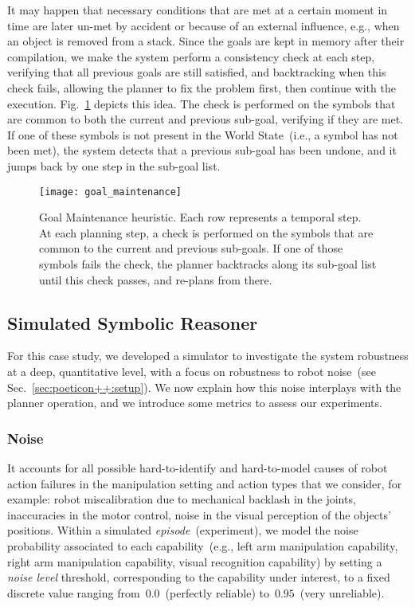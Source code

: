 It may happen that necessary conditions that are met at a certain moment in time are later un-met by accident or because of an external influence, e.g.,
when an object is removed from a stack.
Since the goals are kept in memory after their compilation, we make the system perform a consistency check at each step, verifying that all previous goals are still satisfied, and backtracking when this check fails, allowing the planner to fix the problem first, then continue with the execution.
Fig.~\ref{fig:goal_maintenance} depicts this idea.
The check is performed on the symbols that are common to both the current and previous sub-goal, verifying if they are met.
If one of these symbols is not present in the World State~(i.e., a symbol has not been met), the system detects that a previous sub-goal has been undone, and it jumps back by one step in the sub-goal list.

\begin{figure}
\centering
\texttt{[image: goal\_maintenance]}
\caption[Goal Maintenance heuristic.]{Goal Maintenance heuristic. Each row represents a temporal step. At each planning step, a check is performed on the symbols that are common to the current and previous sub-goals. If one of those symbols fails the check, the planner backtracks along its sub-goal list until this check passes, and re-plans from there.}
\label{fig:goal_maintenance}
\end{figure}

\subsection{Simulated Symbolic Reasoner}
\label{sec:poeticon++:auro:noise_and_metrics}

For this case study, we developed a simulator to investigate the system robustness at a deep, quantitative level, with a focus on robustness to robot noise~(see Sec.~\ref{sec:poeticon++:setup}).
We now explain how this noise interplays with the planner operation, and we introduce some metrics to assess our experiments.

\subsubsection{Noise}

It accounts for all possible hard-to-identify and hard-to-model causes of robot action failures in the manipulation setting and action types that we consider, for example: robot miscalibration due to mechanical backlash in the joints, inaccuracies in the motor control, noise in the visual perception of the objects' positions.
Within a simulated \emph{episode}~(experiment), we model the noise probability associated to each capability~(e.g., left arm manipulation capability, right arm manipulation capability, visual recognition capability) by setting a \emph{noise level} threshold, corresponding to the capability under interest, to a fixed discrete value ranging from~$0.0$~(perfectly reliable) to~$0.95$~(very unreliable).

